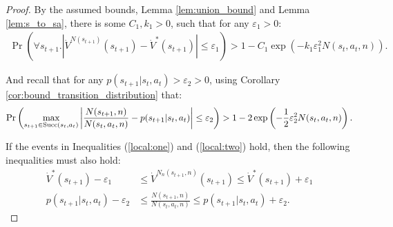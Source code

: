         \begin{proof}
            By the assumed bounds, Lemma \ref{lem:union_bound} and Lemma \ref{lem:s_to_sa}, there is some $C_1,k_1>0$, such that for any $\varepsilon_1 >0$:
            \begin{align}
                \Pr\left(\forall s_{t+1}. \left|\dot{V}^{N(s_{t+1})}(s_{t+1})-\dot{V}^*(s_{t+1}) \right| \leq \varepsilon_1 \right) > 1-C_1\exp(-k_1\varepsilon_1^2 N(s_t,a_t,n)). \label{local:one}
            \end{align}

            And recall that for any $p(s_{t+1}|s_t,a_t) > \varepsilon_2>0$, using Corollary \ref{cor:bound_transition_distribution} that:
            \begin{align}
                \Pr\left(\max_{s_{t+1}\in{\textnormal{Succ}(s_t,a_t)}} 
                    \left| \frac{N(s_{t+1},n)}{N(s_t,a_t,n)} - p(s_{t+1}|s_t,a_t) \right| 
                    \leq \varepsilon_2 \right) 
                        > 1 - 2 \exp\left(-\frac{1}{2}\varepsilon_2^2 N(s_t,a_t,n) \right). \label{local:two}
            \end{align}
            
            If the events in Inequalities (\ref{local:one}) and (\ref{local:two}) hold, then the following inequalities must also hold:
            \begin{align}
                \dot{V}^*(s_{t+1})- \varepsilon_1 
                    &\leq \dot{V}^{N_n(s_{t+1},n)}(s_{t+1}) 
                    \leq \dot{V}^*(s_{t+1})+ \varepsilon_1 \\
                p(s_{t+1}|s_t,a_t) - \varepsilon_2 
                    &\leq \frac{N(s_{t+1},n)}{N(s_t,a_t,n)} 
                    \leq p(s_{t+1}|s_t,a_t) + \varepsilon_2.
            \end{align} 
            

\end{proof}
